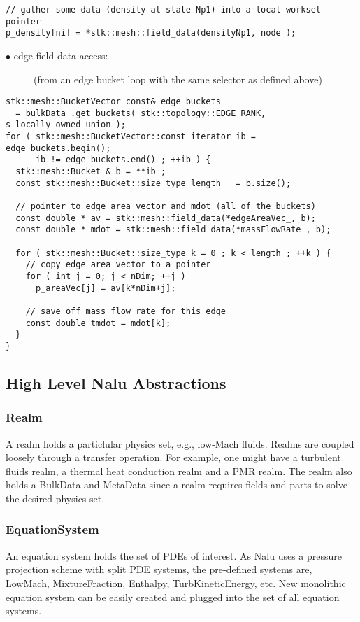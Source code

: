 \begin{lstlisting}
// gather some data (density at state Np1) into a local workset pointer
p_density[ni] = *stk::mesh::field_data(densityNp1, node );
\end{lstlisting}

\begin{description}
\item[$\bullet$ edge field data access:] (from an edge bucket loop with the same selector as defined above)
\end{description}

\begin{lstlisting}
stk::mesh::BucketVector const& edge_buckets 
  = bulkData_.get_buckets( stk::topology::EDGE_RANK, s_locally_owned_union );
for ( stk::mesh::BucketVector::const_iterator ib = edge_buckets.begin();
      ib != edge_buckets.end() ; ++ib ) {
  stk::mesh::Bucket & b = **ib ;
  const stk::mesh::Bucket::size_type length   = b.size();

  // pointer to edge area vector and mdot (all of the buckets)
  const double * av = stk::mesh::field_data(*edgeAreaVec_, b);
  const double * mdot = stk::mesh::field_data(*massFlowRate_, b);
  
  for ( stk::mesh::Bucket::size_type k = 0 ; k < length ; ++k ) {
    // copy edge area vector to a pointer
    for ( int j = 0; j < nDim; ++j )
      p_areaVec[j] = av[k*nDim+j];
     
    // save off mass flow rate for this edge
    const double tmdot = mdot[k];
  }
}
\end{lstlisting}

\subsection{High Level Nalu Abstractions}

\subsubsection{Realm}
A realm holds a particlular physics set, e.g., low-Mach fluids. Realms are coupled
loosely through a transfer operation. For example, one might have a turbulent 
fluids realm, a thermal heat conduction realm and a PMR realm. The realm also 
holds a BulkData and MetaData since a realm requires fields and parts to solve
the desired physics set.

\subsubsection{EquationSystem}
An equation system holds the set of PDEs of interest. As Nalu uses a pressure projection
scheme with split PDE systems, the pre-defined systems are, LowMach, MixtureFraction,
Enthalpy, TurbKineticEnergy, etc. New monolithic equation system can be easily created and 
plugged into the set of all equation systems.

